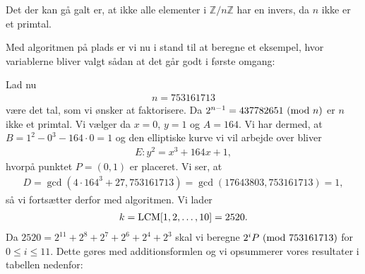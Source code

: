 Det der kan gå galt er, at ikke alle elementer i $\mathbb{Z}/n\mathbb{Z}$ har en invers, da $n$ ikke er et primtal.

Med algoritmen på plads er vi nu i stand til at beregne et eksempel, hvor variablerne bliver valgt sådan at det går godt i første omgang:

\begin{example}
Lad nu 
\begin{align*}
	n = 753161713
\end{align*}
være det tal, som vi ønsker at faktorisere. Da $2^{n-1} = 437782651 \ (\mathrm{mod} \ n)$ er $n$ ikke et primtal. Vi vælger da
$x = 0$, $y = 1$ og $A=164$. Vi har dermed, at $B = 1^2 - 0^3 - 164 \cdot 0 = 1$ og den elliptiske kurve vi vil arbejde over bliver
\begin{align*}
	E : y^2 = x^3 + 164x + 1,
\end{align*}
hvorpå punktet $P=(0, 1)$ er placeret. Vi ser, at 
\begin{align*}
	D = \gcd(4 \cdot 164^3 + 27, 753161713) = \gcd(17643803, 753161713) = 1,
\end{align*}
så vi fortsætter derfor med algoritmen. Vi lader
\begin{align*}
	k = \mathrm{LCM}[1, 2, \ldots, 10] = 2520.
\end{align*}
Da $2520 = 2^{11} + 2^8 + 2^7 + 2^6 + 2^4 + 2^3$ skal vi beregne $2^i P \ (\mathrm{mod} \ 753161713)$ for $0 \leq i \leq 11$. Dette gøres med additionsformlen og vi opsummerer vores resultater i tabellen nedenfor:


\end{example}
